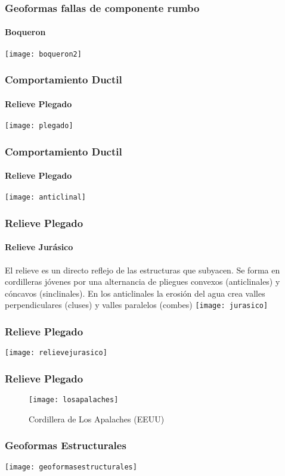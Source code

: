 \documentclass{beamer}
\begin{document}
\begin{frame}
\frametitle{Geoformas fallas de componente rumbo}
\framesubtitle{Boqueron}
\centering
\texttt{[image: boqueron2]}
\end{frame}
\begin{frame}
\frametitle{Comportamiento Ductil}
\framesubtitle{Relieve Plegado}
\centering
\texttt{[image: plegado]}
\end{frame}
\begin{frame}
\frametitle{Comportamiento Ductil}
\framesubtitle{Relieve Plegado}
\centering
\texttt{[image: anticlinal]}
\end{frame}
\begin{frame}
\frametitle{Relieve Plegado}
\framesubtitle{Relieve Jurásico}
\small{El relieve es un directo reflejo de las estructuras que subyacen. Se forma en cordilleras jóvenes por una alternancia de pliegues convexos (anticlinales) y cóncavos (sinclinales). En los anticlinales la erosión del agua crea valles perpendiculares (cluses) y valles paralelos (combes)}
\centering
\texttt{[image: jurasico]}
\end{frame}
\begin{frame}
\frametitle{Relieve Plegado}
\centering
\texttt{[image: relievejurasico]}
\end{frame}
\begin{frame}
\frametitle{Relieve Plegado}
\begin{figure}
\begin{center}
\texttt{[image: losapalaches]}
\caption{Cordillera de Los Apalaches (EEUU)}
\end{center}
\end{figure}
\end{frame}
\begin{frame}
\frametitle{Geoformas Estructurales}
\begin{center}
\texttt{[image: geoformasestructurales]}
\end{center}
\end{frame}
\end{document}
